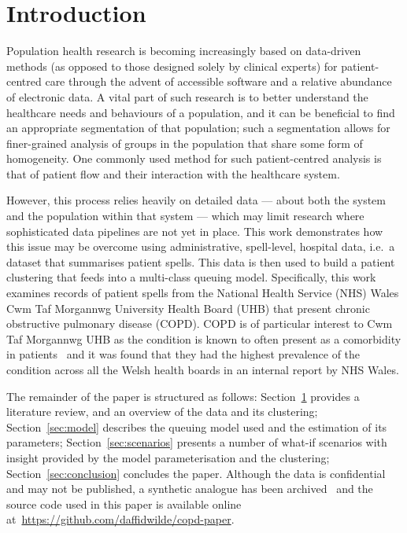 \section{Introduction}\label{sec:intro}

Population health research is becoming increasingly based on data-driven methods
(as opposed to those designed solely by clinical experts) for patient-centred
care through the advent of accessible software and a relative abundance of
electronic data. A vital part of such research is to better understand the
healthcare needs and behaviours of a population, and it can be beneficial to
find an appropriate segmentation of that population; such a segmentation allows
for finer-grained analysis of groups in the population that share some form of
homogeneity. One commonly used method for such patient-centred analysis is that
of patient flow and their interaction with the healthcare system.

However, this process relies heavily on detailed data --- about both the system
and the population within that system --- which may limit research where
sophisticated data pipelines are not yet in place. This work demonstrates how
this issue may be overcome using administrative, spell-level, hospital data,
i.e.\ a dataset that summarises patient spells. This data is then used to build
a patient clustering that feeds into a multi-class queuing model. Specifically,
this work examines records of patient spells from the National Health Service
(NHS) Wales Cwm Taf Morgannwg University Health Board (UHB) that present chronic
obstructive pulmonary disease (COPD).  COPD is of particular interest to Cwm Taf
Morgannwg UHB as the condition is known to often present as a comorbidity in
patients~\cite{Houben2019} and it was found that they had the highest prevalence
of the condition across all the Welsh health boards in an internal report by NHS
Wales.



The remainder of the paper is structured as follows: Section~\ref{sec:intro}
provides a literature review, and an overview of the data and its clustering;
Section~\ref{sec:model} describes the queuing model used and the estimation of
its parameters; Section~\ref{sec:scenarios} presents a number of what-if
scenarios with insight provided by the model parameterisation and the
clustering; Section~\ref{sec:conclusion} concludes the paper. Although the data
is confidential and may not be published, a synthetic analogue has been
archived~\cite{Wilde2020dataset} and the source code used in this paper is
available online at~\url{https://github.com/daffidwilde/copd-paper}.

